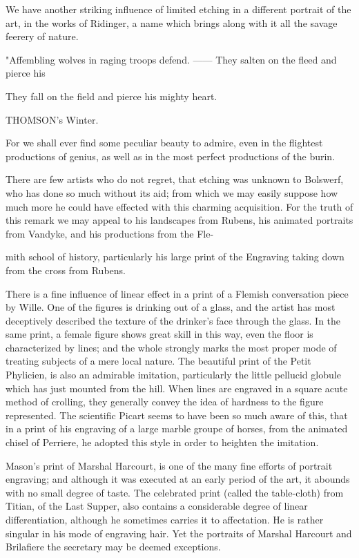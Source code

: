 \documentclass{article}
\begin{document}
We have another striking influence of limited etching in a different portrait of the art, in the works of Ridinger, a name which brings along with it all the savage feerery of nature.

"Affembling wolves in raging troops defend.
—— They salten on the fleed and pierce his

They fall on the field and pierce his mighty heart.

THOMSON's Winter.

For we shall ever find some peculiar beauty to admire, even in the flightest productions of genius, as well as in the most perfect productions of the burin.

There are few artists who do not regret, that etching was unknown to Bolswerf, who has done so much without its aid; from which we may easily suppose how much more he could have effected with this charming acquisition. For the truth of this remark we may appeal to his landscapes from Rubens, his animated portraits from Vandyke, and his productions from the Fle-

mith school of history, particularly his large print of the Engraving taking down from the cross from Rubens.

There is a fine influence of linear effect in a print of a Flemish conversation piece by Wille. One of the figures is drinking out of a glass, and the artist has most deceptively described the texture of the drinker's face through the glass. In the same print, a female figure shows great skill in this way, even the floor is characterized by lines; and the whole strongly marks the most proper mode of treating subjects of a mere local nature. The beautiful print of the Petit Phylicien, is also an admirable imitation, particularly the little pellucid globule which has just mounted from the hill. When lines are engraved in a square acute method of crolling, they generally convey the idea of hardness to the figure represented. The scientific Picart seems to have been so much aware of this, that in a print of his engraving of a large marble groupe of horses, from the animated chisel of Perriere, he adopted this style in order to heighten the imitation.

Mason's print of Marshal Harcourt, is one of the many fine efforts of portrait engraving; and although it was executed at an early period of the art, it abounds with no small degree of taste. The celebrated print (called the table-cloth) from Titian, of the Last Supper, also contains a considerable degree of linear differentiation, although he sometimes carries it to affectation. He is rather singular in his mode of engraving hair. Yet the portraits of Marshal Harcourt and Brilafiere the secretary may be deemed exceptions.
\end{document}
